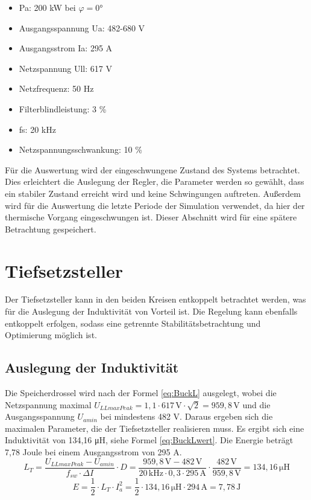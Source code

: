 \begin{itemize}
\item \gls{Pa}: 200 kW bei $\varphi = 0°$
\item Ausgangsspannung \gls{Ua}: 482-680 V
\item Ausgangsstrom \gls{Ia}: 	295 A
\item Netzspannung \gls{Ull}:		617 V
\item Netzfrequenz:		50 Hz
\item Filterblindleistung: 3 \%
\item \gls{fs}: 20 kHz
\item Netzspannungsschwankung: 10 \%
\end{itemize}

Für die Auswertung wird der eingeschwungene Zustand des Systems betrachtet. Dies erleichtert die Auslegung der Regler, die Parameter werden so gewählt, dass ein stabiler Zustand erreicht wird und keine Schwingungen auftreten. Außerdem wird für die Auswertung die letzte Periode der Simulation verwendet, da hier der thermische Vorgang eingeschwungen ist. Dieser Abschnitt wird für eine spätere Betrachtung gespeichert.

\section{Tiefsetzsteller}
Der Tiefsetzsteller kann in den beiden Kreisen entkoppelt betrachtet werden, was für die Auslegung der Induktivität von Vorteil ist. Die Regelung kann ebenfalls entkoppelt erfolgen, sodass eine getrennte Stabilitätsbetrachtung und Optimierung möglich ist. 
	\subsection{Auslegung der Induktivität}
	Die Speicherdrossel wird nach der Formel \ref{eq:BuckL} ausgelegt, wobei die Netzspannung maximal $U_{LLmaxPeak}=1,1 \cdot 617\, \si{\V} \cdot \sqrt{2}=959,8\, \si{\V}$ und die Ausgangsspannung $U_{amin}$ bei mindestens 482 \si{\V}. Daraus ergeben sich die maximalen Parameter, die der Tiefsetzsteller realisieren muss. Es ergibt sich eine Induktivität von 134,16 \si{\micro \henry}, siehe Formel \ref{eq:BuckLwert}. Die Energie beträgt 7,78 Joule bei einem Ausgangsstrom von 295 A. 
	\begin{equation}
	\label{eq:BuckLwert}
	L_{T}= \dfrac{U_{LLmaxPeak}-U_{amin}}{f_{sw} \cdot \Delta I} \cdot D = \dfrac{959,8\,\si{\V} - 482\, \si{\V}}{20\, \si{\kilo \hertz}\cdot 0,3 \cdot 295\, \si{\ampere}} \cdot \dfrac{482\, \si{\V}}{959,8\, \si{\V}}= 134,16 \,\si{\micro \henry} 
	\end{equation}
	\begin{equation}
		E=\dfrac{1}{2} \cdot L_{T} \cdot I_{a}^{2} = \dfrac{1}{2} \cdot 134,16\, \si{\micro \henry}  \cdot 294\, \si{\ampere} = 7,78\, \si{\joule}
	\end{equation}
